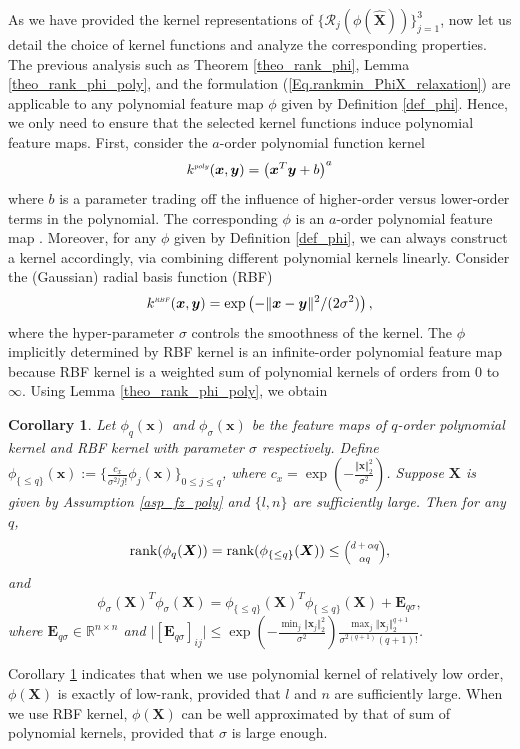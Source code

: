 \documentclass[letterpaper]{article} %
\newtheorem{corollary}{Corollary}
\begin{document}
As we have provided the kernel representations of $\lbrace \mathcal{R}_j(\phi(\hat{\bm{X}}))\rbrace_{j=1}^3$, now let us detail the choice of kernel functions and analyze the corresponding properties. The previous analysis such as Theorem \ref{theo_rank_phi}, Lemma \ref{theo_rank_phi_poly}, and the formulation (\ref{Eq.rankmin_PhiX_relaxation}) are applicable to any polynomial feature map $\phi$ given by Definition \ref{def_phi}. Hence, we only need to ensure that the selected kernel functions induce polynomial feature maps. First, consider the $a$-order polynomial function kernel
$$k^{\scaleobj{0.7}{poly}}(\bm{x},\bm{y})=\left(\bm{x}^T\bm{y}+b\right)^a$$
where $b$ is a parameter trading off the influence of higher-order versus lower-order terms in the polynomial. The corresponding $\phi$ is an $a$-order polynomial feature map \cite{KPCA1998}. Moreover, for any $\phi$ given by Definition \ref{def_phi}, we can always construct a kernel accordingly, via combining different polynomial kernels linearly.
Consider the (Gaussian) radial basis function (RBF)
$$
k^{\scaleobj{0.6}{RBF}}(\bm{x},\bm{y})=\textup{exp}\left(-\Vert \bm{x}-\bm{y}\Vert^2/(2\sigma^2)\right),
$$
where the hyper-parameter $\sigma$ controls the smoothness of the kernel. The $\phi$ implicitly determined by RBF kernel is an infinite-order polynomial feature map because RBF kernel is a weighted sum of polynomial kernels of orders from $0$ to $\infty$.
Using Lemma \ref{theo_rank_phi_poly}, we obtain
\begin{corollary}\label{theo_rank_phi_polyrbf}
Let $\phi_q(\bm{x})$ and $\phi_{\sigma}(\bm{x})$ be the feature maps of $q$-order polynomial kernel and RBF kernel with parameter $\sigma$ respectively. Define $\phi_{\lbrace\leq q\rbrace}(\bm{x}):=\lbrace\tfrac{c_x}{\sigma^{2j}j!}\phi_j(\bm{x})\rbrace_{0\leq j\leq q}$, where $c_x=\exp(-\tfrac{\Vert \bm{x}\Vert_2^2}{\sigma^2})$.
Suppose $\bm{X}$ is given by Assumption \ref{asp_fz_poly} and $\lbrace l,n\rbrace$ are sufficiently large. Then for any $q$,
$$
\textup{rank}(\phi_q(\bm{X}))=\textup{rank}(\phi_{\lbrace\leq q\rbrace}(\bm{X}))\leq\scaleobj{0.7}{\binom{d+\alpha q}{\alpha q}},
$$
and
$$
\phi_{\sigma}(\bm{X})^T\phi_{\sigma}(\bm{X})=\phi_{\lbrace\leq q\rbrace}(\bm{X})^T\phi_{\lbrace\leq q\rbrace}(\bm{X})+\bm{E}_{q\sigma},
$$
where $\bm{E}_{q\sigma}\in\mathbb{R}^{n\times n}$ and $\vert[\bm{E}_{q\sigma}]_{ij}\vert\leq \exp(-\tfrac{\min_{j}\Vert \bm{x}_j\Vert_2^2}{\sigma^2})\tfrac{\max_{j}\Vert \bm{x}_j\Vert_2^{q+1}}{\sigma^{2(q+1)}(q+1)!}$.
\end{corollary}
Corollary \ref{theo_rank_phi_polyrbf} indicates that when we use polynomial kernel of relatively low order, $\phi(\bm{X})$ is exactly of low-rank, provided that $l$ and $n$ are sufficiently large. When we use RBF kernel, $\phi(\bm{X})$ can be well approximated by that of sum of polynomial kernels, provided that $\sigma$ is large enough.
\end{document}
